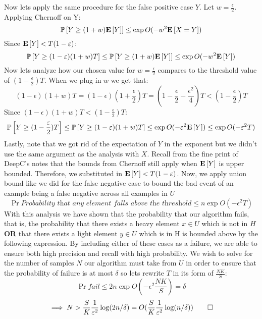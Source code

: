 \documentclass[12pt]{article}
\begin{document}
\begin{solution}
Now lets apply the same procedure for the false positive case $Y$. Let $w = \frac{\epsilon}{2}$. Applying Chernoff on Y:
\[
\Pr{Y \geq (1+w)\Exp{Y}} \leq \exp{O(-w^2\Exp{X=Y})}
\]
Since $\Exp{Y} < T(1-\epsilon)$:
\[
\Pr{Y \geq (1-\epsilon)(1+w)T} \leq \Pr{Y \geq (1+w)\Exp{Y}} \leq \exp{O(-w^2\Exp{Y})}
\]
Now lets analyze how our chosen value for $w = \frac{\epsilon}{2}$ compares to the threshold value of $(1-\frac{\epsilon}{2})T$. When we plug in $w$ we get that:
\[
(1-\epsilon)(1+w)T = (1-\epsilon)(1+\frac{\epsilon}{2})T = (1 - \frac{\epsilon}{2} - \frac{\epsilon^2}{4})T < (1 - \frac{\epsilon}{2})T
\]
Since $(1-\epsilon)(1+w)T < (1 - \frac{\epsilon}{2})T$:
\[
\Pr{Y \geq (1 - \frac{\epsilon}{2})T} \leq \Pr{Y \geq (1-\epsilon)(1+w)T} \leq \exp{O(-\epsilon^2\Exp{Y})} \leq \exp{O(-\epsilon^2T)}
\]
Lastly, note that we got rid of the expectation of $Y$ in the exponent but we didn't use the same argument as the analysis with $X$. Recall from the fine print of DeepC's notes that the bounds from Chernoff still apply when $\Exp{Y}$ is upper bounded. Therefore, we substituted in $\Exp{Y} < T(1-\epsilon)$. Now, we apply union bound like we did for the false negative case to bound the bad event of an example being a false negative across all examples in $U$
\[
\Pr{\textit{Probability that any element falls above the threshold}} \leq n\exp{O(-\epsilon^2T)} 
\]
With this analysis we have shown that the probability that our algorithm fails, that is, the probability that there exists a heavy element $x \in U$ which is not in $H$ \textbf{OR} that there exists a light element $y \in U$ which is in H is bounded above by the following expression. By including either of these cases as a failure, we are able to ensure both high precision and recall with high probability. We wish to solve for the number of samples $N$ our algorithm must take from $U$ in order to ensure that the probability of failure is at most $\delta$ so lets rewrite $T$ in its form of $\frac{NK}{S}$:
\[
\Pr{\textit{fail}} \leq 2n\exp{O(-\epsilon^2\frac{NK}{S})} = \delta
\]
\[
\implies N > \frac{S}{K} \frac{1}{\epsilon^2} \log(2n/\delta) = O(\frac{S}{K} \frac{1}{\epsilon^2} \log(n/\delta)) \qed
\]



\end{solution}
\end{document}
